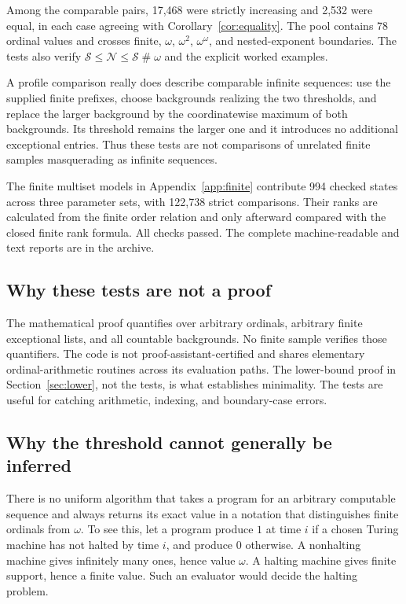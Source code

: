 \documentclass[11pt,letterpaper]{article}
\theoremstyle{definition}
\theoremstyle{remark}
\newcommand{\Nop}{\mathcal N}
\newcommand{\Sop}{\mathcal S}
\newcommand{\ns}{\mathbin{\#}}
\begin{document}
Among the comparable pairs, 17,468 were strictly increasing and 2,532 were equal, in each case agreeing with Corollary~\ref{cor:equality}. The pool contains 78 ordinal values and crosses finite, $\omega$, $\omega^2$, $\omega^\omega$, and nested-exponent boundaries. The tests also verify $\Sop\le\Nop\le\Sop\ns\omega$ and the explicit worked examples.

A profile comparison really does describe comparable infinite sequences: use the supplied finite prefixes, choose backgrounds realizing the two thresholds, and replace the larger background by the coordinatewise maximum of both backgrounds. Its threshold remains the larger one and it introduces no additional exceptional entries. Thus these tests are not comparisons of unrelated finite samples masquerading as infinite sequences.

The finite multiset models in Appendix~\ref{app:finite} contribute 994 checked states across three parameter sets, with 122,738 strict comparisons. Their ranks are calculated from the finite order relation and only afterward compared with the closed finite rank formula. All checks passed. The complete machine-readable and text reports are in the archive.

\subsection{Why these tests are not a proof}

The mathematical proof quantifies over arbitrary ordinals, arbitrary finite exceptional lists, and all countable backgrounds. No finite sample verifies those quantifiers. The code is not proof-assistant-certified and shares elementary ordinal-arithmetic routines across its evaluation paths. The lower-bound proof in Section~\ref{sec:lower}, not the tests, is what establishes minimality. The tests are useful for catching arithmetic, indexing, and boundary-case errors.

\subsection{Why the threshold cannot generally be inferred}

There is no uniform algorithm that takes a program for an arbitrary computable sequence and always returns its exact value in a notation that distinguishes finite ordinals from $\omega$. To see this, let a program produce $1$ at time $i$ if a chosen Turing machine has not halted by time $i$, and produce $0$ otherwise. A nonhalting machine gives infinitely many ones, hence value $\omega$. A halting machine gives finite support, hence a finite value. Such an evaluator would decide the halting problem.
\end{document}
